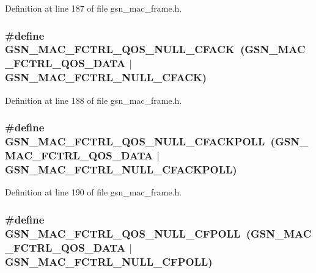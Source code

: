 Definition at line 187 of file gsn\_\-mac\_\-frame.h.

\hypertarget{a00523_a3288ff0e1bb3bfba47428efa9024c7dd}{
\subsubsection[{GSN\_\-MAC\_\-FCTRL\_\-QOS\_\-NULL\_\-CFACK}]{\setlength{\rightskip}{0pt plus 5cm}\#define GSN\_\-MAC\_\-FCTRL\_\-QOS\_\-NULL\_\-CFACK~(GSN\_\-MAC\_\-FCTRL\_\-QOS\_\-DATA  $|$ GSN\_\-MAC\_\-FCTRL\_\-NULL\_\-CFACK)}}
\label{a00523_a3288ff0e1bb3bfba47428efa9024c7dd}


Definition at line 188 of file gsn\_\-mac\_\-frame.h.

\hypertarget{a00523_a3b2fad615ee21be5a8eafd142025dbef}{
\subsubsection[{GSN\_\-MAC\_\-FCTRL\_\-QOS\_\-NULL\_\-CFACKPOLL}]{\setlength{\rightskip}{0pt plus 5cm}\#define GSN\_\-MAC\_\-FCTRL\_\-QOS\_\-NULL\_\-CFACKPOLL~(GSN\_\-MAC\_\-FCTRL\_\-QOS\_\-DATA  $|$ GSN\_\-MAC\_\-FCTRL\_\-NULL\_\-CFACKPOLL)}}
\label{a00523_a3b2fad615ee21be5a8eafd142025dbef}


Definition at line 190 of file gsn\_\-mac\_\-frame.h.

\hypertarget{a00523_a1cf034f1466459b6b8afdbd7dbb32552}{
\subsubsection[{GSN\_\-MAC\_\-FCTRL\_\-QOS\_\-NULL\_\-CFPOLL}]{\setlength{\rightskip}{0pt plus 5cm}\#define GSN\_\-MAC\_\-FCTRL\_\-QOS\_\-NULL\_\-CFPOLL~(GSN\_\-MAC\_\-FCTRL\_\-QOS\_\-DATA  $|$ GSN\_\-MAC\_\-FCTRL\_\-NULL\_\-CFPOLL)}}
\label{a00523_a1cf034f1466459b6b8afdbd7dbb32552}


